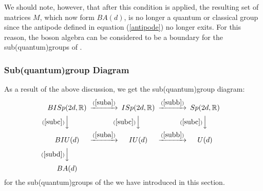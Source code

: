 We should note, however, that after this condition is applied, the
resulting set of matrices $M$, which now form $BA(d)$, is
no longer a quantum or classical group since the antipode defined
in equation (\ref{antipode}) no longer exits. For this reason,
the boson algebra can be considered to be a boundary for the
sub(quantum)groups of \BISp.

\subsubsection{Sub(quantum)group Diagram}
As a result of the above discussion, we get the sub(quantum)group
diagram:
\[
\begin{CD}
{BISp(2d, \IR)} @>(\ref{suba})>> {ISp(2d, \IR)} @>(\ref{subb})>> {Sp(2d, \IR)} \\
@V(\ref{subc})VV @V(\ref{subc})VV @V(\ref{subc})VV \\
{BIU(d)} @>(\ref{suba})>> {IU(d)} @>(\ref{subb})>> {U(d)} \\
@V(\ref{subd})VV \\
{BA(d)}
\end{CD}
\]
for the sub(quantum)groups of the \BISp we have introduced in this
section.

